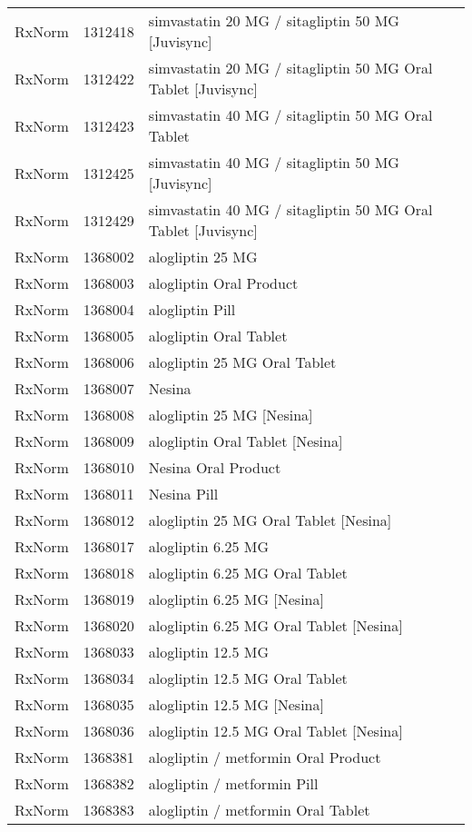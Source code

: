 \begin{longtable}{p{}p{}p{}}
  RxNorm & 1312418 & simvastatin 20 MG / sitagliptin 50 MG [Juvisync] \\ 
  RxNorm & 1312422 & simvastatin 20 MG / sitagliptin 50 MG Oral Tablet [Juvisync] \\ 
  RxNorm & 1312423 & simvastatin 40 MG / sitagliptin 50 MG Oral Tablet \\ 
  RxNorm & 1312425 & simvastatin 40 MG / sitagliptin 50 MG [Juvisync] \\ 
  RxNorm & 1312429 & simvastatin 40 MG / sitagliptin 50 MG Oral Tablet [Juvisync] \\ 
  RxNorm & 1368002 & alogliptin 25 MG \\ 
  RxNorm & 1368003 & alogliptin Oral Product \\ 
  RxNorm & 1368004 & alogliptin Pill \\ 
  RxNorm & 1368005 & alogliptin Oral Tablet \\ 
  RxNorm & 1368006 & alogliptin 25 MG Oral Tablet \\ 
  RxNorm & 1368007 & Nesina \\ 
  RxNorm & 1368008 & alogliptin 25 MG [Nesina] \\ 
  RxNorm & 1368009 & alogliptin Oral Tablet [Nesina] \\ 
  RxNorm & 1368010 & Nesina Oral Product \\ 
  RxNorm & 1368011 & Nesina Pill \\ 
  RxNorm & 1368012 & alogliptin 25 MG Oral Tablet [Nesina] \\ 
  RxNorm & 1368017 & alogliptin 6.25 MG \\ 
  RxNorm & 1368018 & alogliptin 6.25 MG Oral Tablet \\ 
  RxNorm & 1368019 & alogliptin 6.25 MG [Nesina] \\ 
  RxNorm & 1368020 & alogliptin 6.25 MG Oral Tablet [Nesina] \\ 
  RxNorm & 1368033 & alogliptin 12.5 MG \\ 
  RxNorm & 1368034 & alogliptin 12.5 MG Oral Tablet \\ 
  RxNorm & 1368035 & alogliptin 12.5 MG [Nesina] \\ 
  RxNorm & 1368036 & alogliptin 12.5 MG Oral Tablet [Nesina] \\ 
  RxNorm & 1368381 & alogliptin / metformin Oral Product \\ 
  RxNorm & 1368382 & alogliptin / metformin Pill \\ 
  RxNorm & 1368383 & alogliptin / metformin Oral Tablet \\ 

\end{longtable}
